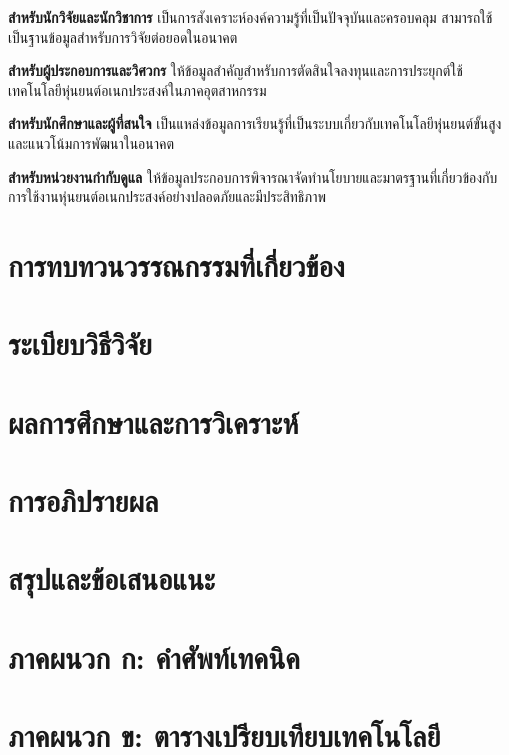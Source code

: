 \documentclass[a4paper]{article}
\begin{document}
\textbf{สำหรับนักวิจัยและนักวิชาการ} เป็นการสังเคราะห์องค์ความรู้ที่เป็นปัจจุบันและครอบคลุม สามารถใช้เป็นฐานข้อมูลสำหรับการวิจัยต่อยอดในอนาคต

\textbf{สำหรับผู้ประกอบการและวิศวกร} ให้ข้อมูลสำคัญสำหรับการตัดสินใจลงทุนและการประยุกต์ใช้เทคโนโลยีหุ่นยนต์อเนกประสงค์ในภาคอุตสาหกรรม

\textbf{สำหรับนักศึกษาและผู้ที่สนใจ} เป็นแหล่งข้อมูลการเรียนรู้ที่เป็นระบบเกี่ยวกับเทคโนโลยีหุ่นยนต์ขั้นสูงและแนวโน้มการพัฒนาในอนาคต

\textbf{สำหรับหน่วยงานกำกับดูแล} ให้ข้อมูลประกอบการพิจารณาจัดทำนโยบายและมาตรฐานที่เกี่ยวข้องกับการใช้งานหุ่นยนต์อเนกประสงค์อย่างปลอดภัยและมีประสิทธิภาพ

\section{การทบทวนวรรณกรรมที่เกี่ยวข้อง} 

\section{ระเบียบวิธีวิจัย}

\section{ผลการศึกษาและการวิเคราะห์}

\section{การอภิปรายผล}

\section{สรุปและข้อเสนอแนะ}

\printbibliography[title=เอกสารอ้างอิง]

\appendix

\section{ภาคผนวก ก: คำศัพท์เทคนิค}

\section{ภาคผนวก ข: ตารางเปรียบเทียบเทคโนโลยี}
\end{document}
